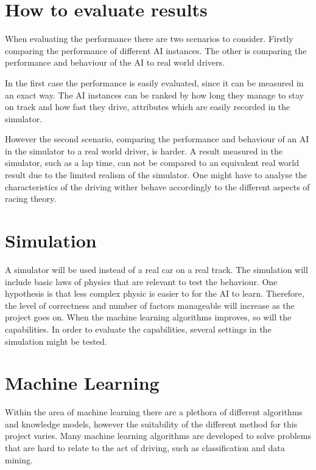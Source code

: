 
\section{How to evaluate results}
When evaluating the performance there are two scenarios to consider. Firstly comparing the performance of different AI instances. The other is comparing the performance and behaviour of the AI to real world drivers. 

In the first case the performance is easily evaluated, since it can be measured in an exact way. The AI instances can be ranked by how long they manage to stay on track and how fast they drive, attributes which are easily recorded in the simulator. 

However the second scenario, comparing the performance and behaviour of an AI in the simulator to a real world driver, is harder. A result measured in the simulator, such as a lap time, can not be compared to an equivalent real world result due to the limited realism of the simulator. One might have to analyse the characteristics of the driving wither behave accordingly to the different aspects of racing theory. 

\section{Simulation}


A simulator will be used instead of a real car on a real track. The simulation will include basic laws of physics that are relevant to test the behaviour. One hypothesis is that less complex physic is easier to for the AI to learn. Therefore, the level of correctness and number of factors manageable will increase as the project goes on. When the machine learning algorithms improves, so will the capabilities. In order to evaluate the capabilities, several settings in the simulation might be tested.


\section{Machine Learning}
Within the area of machine learning there are a plethora of different algorithms and knowledge models, however the suitability of the different method for this project varies. Many machine learning algorithms are developed to solve problems that are hard to relate to the act of driving, such as classification and data mining. 

